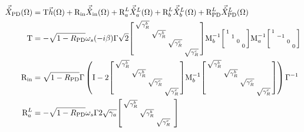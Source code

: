 \begin{align}\label{eq:nIS_Xpd}
\vec{\hat X}_\mathrm{PD}(\Omega)&=\text{T}\vec h(\Omega)+\text{R}_\text{in}\vec{\hat X}_\mathrm{in}(\Omega)+\text{R}^L_a\vec{\hat X}^L_a(\Omega)+\text{R}^L_b\vec{\hat X}^L_b(\Omega)+\text{R}^L_\text{PD}\vec{\hat X}^L_\text{PD}(\Omega)\\
\text{T}&=-\sqrt{1-R_\text{PD}}\omega_s(-i\beta)\Gamma \sqrt{2}\begin{bsmallmatrix}
\sqrt{\gamma^b_R} &  &  &  \\
 & \sqrt{\gamma^b_R} &  &  \\
 &  & \sqrt{\gamma^c_R} &  \\
 &  &  & \sqrt{\gamma^c_R}
\end{bsmallmatrix}\text{M}_b^{-1}\begin{bsmallmatrix}
1 &  &  &  \\
 & 1 &  &  \\
 &  & 0 &  \\
 &  &  & 0
\end{bsmallmatrix}\text{M}_a^{-1}\begin{bsmallmatrix}
1 &  &  &  \\
 & -1 &  &  \\
 &  & 0 &  \\
 &  &  & 0
\end{bsmallmatrix}\\
\text{R}_\text{in}&=\sqrt{1-R_\text{PD}}\Gamma\left(\text{I}-2\begin{bsmallmatrix}
\sqrt{\gamma^b_R} &  &  &  \\
 & \sqrt{\gamma^b_R} &  &  \\
 &  & \sqrt{\gamma^c_R} &  \\
 &  &  & \sqrt{\gamma^c_R}
\end{bsmallmatrix}\text{M}_b^{-1}\begin{bsmallmatrix}
\sqrt{\gamma^b_R} &  &  &  \\
 & \sqrt{\gamma^b_R} &  &  \\
 &  & \sqrt{\gamma^c_R} &  \\
 &  &  & \sqrt{\gamma^c_R}
\end{bsmallmatrix}\right)\Gamma^{-1}\\
\text{R}^L_a&=-\sqrt{1-R_\text{PD}}\omega_s\Gamma 2\sqrt{\gamma_a}\begin{bsmallmatrix}
\sqrt{\gamma^b_R} &  &  &  \\
 & \sqrt{\gamma^b_R} &  &  \\
 &  & \sqrt{\gamma^c_R} &  \\

\end{bsmallmatrix}
\end{align}
